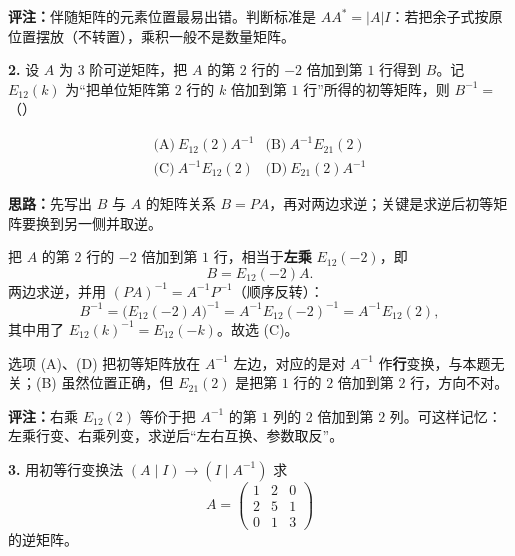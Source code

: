 \textbf{评注：}伴随矩阵的元素位置最易出错。判断标准是 \(AA^*=|A|I\)：若把余子式按原位置摆放（不转置），乘积一般不是数量矩阵。

\else \answerarea[8] \fi%

\textbf{2.} 设 \(A\) 为 \(3\) 阶可逆矩阵，把 \(A\) 的第 \(2\) 行的 \(-2\) 倍加到第 \(1\) 行得到 \(B\)。记 \(E_{12}(k)\) 为“把单位矩阵第 \(2\) 行的 \(k\) 倍加到第 \(1\) 行”所得的初等矩阵，则 \(B^{-1}=\)（\quad）

\[
\begin{array}{ll}
\text{(A)}\ E_{12}(2)A^{-1} & \text{(B)}\ A^{-1}E_{21}(2)\\[3pt]
\text{(C)}\ A^{-1}E_{12}(2) & \text{(D)}\ E_{21}(2)A^{-1}
\end{array}
\]

\ifshowsolutions%
\textbf{思路：}先写出 \(B\) 与 \(A\) 的矩阵关系 \(B=PA\)，再对两边求逆；关键是求逆后初等矩阵要换到另一侧并取逆。

把 \(A\) 的第 \(2\) 行的 \(-2\) 倍加到第 \(1\) 行，相当于\textbf{左乘} \(E_{12}(-2)\)，即
\[
B=E_{12}(-2)A.
\]
两边求逆，并用 \((PA)^{-1}=A^{-1}P^{-1}\)（顺序反转）：
\[
B^{-1}=\bigl(E_{12}(-2)A\bigr)^{-1}=A^{-1}E_{12}(-2)^{-1}=A^{-1}E_{12}(2),
\]
其中用了 \(E_{12}(k)^{-1}=E_{12}(-k)\)。故选 (C)。

选项 (A)、(D) 把初等矩阵放在 \(A^{-1}\) 左边，对应的是对 \(A^{-1}\) 作\textbf{行}变换，与本题无关；(B) 虽然位置正确，但 \(E_{21}(2)\) 是把第 \(1\) 行的 \(2\) 倍加到第 \(2\) 行，方向不对。

\textbf{评注：}右乘 \(E_{12}(2)\) 等价于把 \(A^{-1}\) 的第 \(1\) 列的 \(2\) 倍加到第 \(2\) 列。可这样记忆：左乘行变、右乘列变，求逆后“左右互换、参数取反”。

\else \answerarea[5] \fi%

\textbf{3.} 用初等行变换法 \((A\mid I)\to(I\mid A^{-1})\) 求
\[
A=\begin{pmatrix}
1&2&0\\
2&5&1\\
0&1&3
\end{pmatrix}
\]
的逆矩阵。

